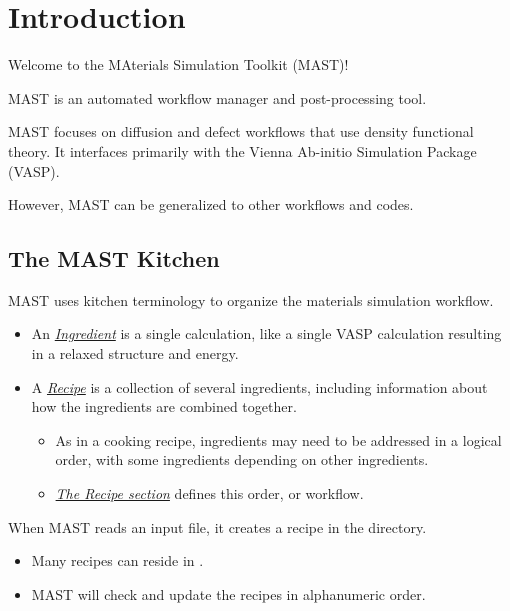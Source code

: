 \documentclass[letterpaper,10pt,english]{sphinxmanual}
\begin{document}
\chapter{Introduction}
\label{0_0_introduction:introduction}\label{0_0_introduction::doc}
Welcome to the MAterials Simulation Toolkit (MAST)!

MAST is an automated workflow manager and post-processing tool.

MAST focuses on diffusion and defect workflows that use density functional theory. It interfaces primarily with the Vienna Ab-initio Simulation Package (VASP).

However, MAST can be generalized to other workflows and codes.


\section{The MAST Kitchen}
\label{0_0_introduction:the-mast-kitchen}
MAST uses kitchen terminology to organize the materials simulation workflow.
\begin{itemize}
\item {} 
An {\hyperref[2_0_ingredients::doc]{\emph{Ingredient}}} is a single calculation, like a single VASP calculation resulting in a relaxed structure and energy.

\item {} 
A {\hyperref[4_0_recipe::doc]{\emph{Recipe}}} is a collection of several ingredients, including information about how the ingredients are combined together.
\begin{itemize}
\item {} 
As in a cooking recipe, ingredients may need to be addressed in a logical order, with some ingredients depending on other ingredients.

\item {} 
{\hyperref[3_1_3_recipe::doc]{\emph{The Recipe section}}} defines this order, or workflow.

\end{itemize}

\end{itemize}

When MAST reads an input file, it creates a recipe in the  directory.
\begin{itemize}
\item {} 
Many recipes can reside in .

\item {} 
MAST will check and update the recipes in alphanumeric order.

\end{itemize}
\end{document}
